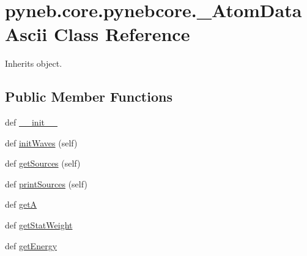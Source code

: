 \hypertarget{classpyneb_1_1core_1_1pynebcore_1_1___atom_data_ascii}{}\section{pyneb.\+core.\+pynebcore.\+\_\+\+Atom\+Data\+Ascii Class Reference}
\label{classpyneb_1_1core_1_1pynebcore_1_1___atom_data_ascii}


Inherits object.

\subsection*{Public Member Functions}
\begin{DoxyCompactItemize}
\item 
def \hyperlink{classpyneb_1_1core_1_1pynebcore_1_1___atom_data_ascii_a18839ec771a0105ab111f8c6411c70e1}{\+\_\+\+\_\+init\+\_\+\+\_\+}
\item 
def \hyperlink{classpyneb_1_1core_1_1pynebcore_1_1___atom_data_ascii_a583ecd4bdf83ecdecb7f5d7516aaa101}{init\+Waves} (self)
\item 
def \hyperlink{classpyneb_1_1core_1_1pynebcore_1_1___atom_data_ascii_aac811b213b17e3c37999ba75d0aa64f3}{get\+Sources} (self)
\item 
def \hyperlink{classpyneb_1_1core_1_1pynebcore_1_1___atom_data_ascii_a3fdbfe99be5b68bed58b5f1500448242}{print\+Sources} (self)
\item 
def \hyperlink{classpyneb_1_1core_1_1pynebcore_1_1___atom_data_ascii_a858e1ecef317c56f7f9e771ed0b5aca9}{get\+A}
\item 
def \hyperlink{classpyneb_1_1core_1_1pynebcore_1_1___atom_data_ascii_a0b913fd7ff9b235a699c735b33c96e85}{get\+Stat\+Weight}
\item 
def \hyperlink{classpyneb_1_1core_1_1pynebcore_1_1___atom_data_ascii_af747dc13a858a4eacc6107aedad89bd0}{get\+Energy}
\end{DoxyCompactItemize}
